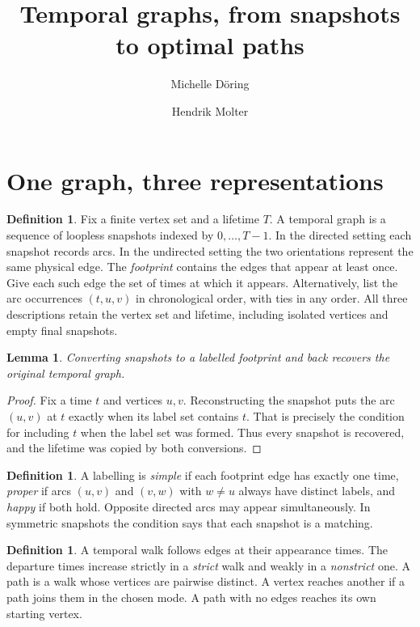 \documentclass[11pt]{article}
\title{Temporal graphs, from snapshots to optimal paths}
\author{Michelle Döring \and Hendrik Molter}
\date{}
\newtheorem{lemma}[theorem]{Lemma}
\theoremstyle{definition}
\newtheorem{definition}[theorem]{Definition}
\begin{document}
\maketitle

\section{One graph, three representations}

\begin{definition}
Fix a finite vertex set and a lifetime $T$. A temporal graph is a sequence
of loopless snapshots indexed by $0,\ldots,T-1$. In the directed setting
each snapshot records arcs. In the undirected setting the two orientations
represent the same physical edge. The \emph{footprint} contains the edges
that appear at least once. Give each such edge the set of times at which it
appears. Alternatively, list the arc occurrences $(t,u,v)$ in chronological
order, with ties in any order. All three descriptions retain the vertex set
and lifetime, including isolated vertices and empty final snapshots.
\end{definition}

\begin{lemma}
Converting snapshots to a labelled footprint and back recovers the original
temporal graph.
\end{lemma}

\begin{proof}
Fix a time $t$ and vertices $u,v$. Reconstructing the snapshot puts the arc
$(u,v)$ at $t$ exactly when its label set contains $t$. That is precisely
the condition for including $t$ when the label set was formed. Thus every
snapshot is recovered, and the lifetime was copied by both conversions.
\end{proof}

\begin{definition}
A labelling is \emph{simple} if each footprint edge has exactly one time,
\emph{proper} if arcs $(u,v)$ and $(v,w)$ with $w\ne u$ always have distinct labels,
and \emph{happy} if both hold. Opposite directed arcs may appear simultaneously. In symmetric snapshots the condition says that each snapshot is a matching.
\end{definition}

\begin{definition}
A temporal walk follows edges at their appearance times. The departure
times increase strictly in a \emph{strict} walk and weakly in a
\emph{nonstrict} one. A path is a walk whose vertices are pairwise distinct.
A vertex reaches another if a path joins them in the chosen mode.
A path with no edges reaches its own starting vertex.
\end{definition}
\end{document}
